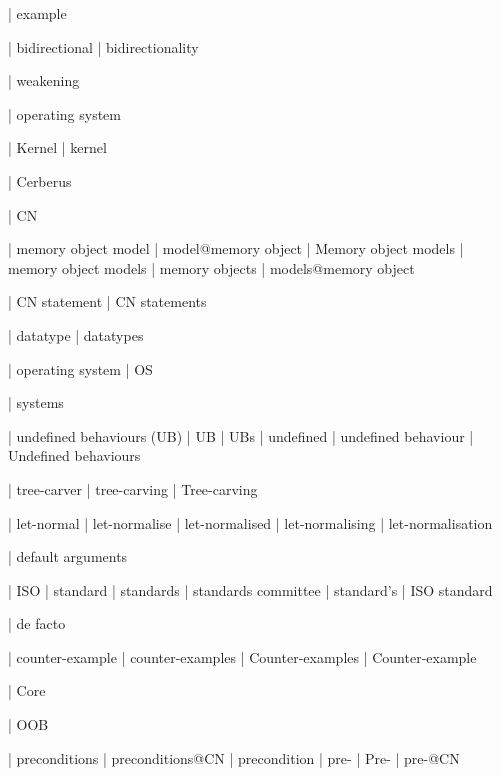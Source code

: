 


 | example

 | bidirectional
 | bidirectionality

 | weakening

 | operating system

 | Kernel
 | kernel

 | Cerberus

 | CN

 | memory object model
 | model@memory object
 | Memory object models
 | memory object models
 | memory objects
 | models@memory object

 | CN statement
 | CN statements

 | datatype
 | datatypes

 | operating system
 | OS

 | systems

 | undefined behaviours (UB)
 | UB
 | UBs
 | undefined
 | undefined behaviour
 | Undefined behaviours

 | tree-carver
 | tree-carving
 | Tree-carving

 | let-normal
 | let-normalise
 | let-normalised
 | let-normalising
 | let-normalisation

 | default arguments

 | ISO
 | standard
 | standards
 | standards committee
 | standard's
 | ISO standard

 | de facto

 | counter-example
 | counter-examples
 | Counter-examples
 | Counter-example

 | Core

 | OOB

 | preconditions
 | preconditions@CN
 | precondition
 | pre-
 | Pre-
 | pre-@CN

